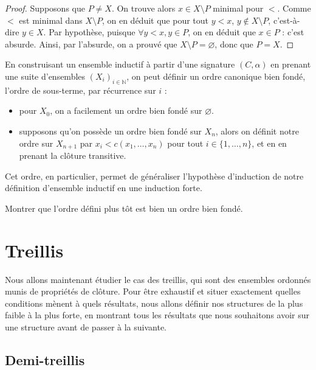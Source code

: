 \begin{proof}
  Supposons que $P\neq X$. On trouve alors $x\in X \setminus P$ minimal pour $<$.
  Comme $<$ est minimal dans
  $X\setminus P$, on en déduit que pour tout $y < x$, $y \notin X\setminus P$,
  c'est-à-dire $y\in X$. Par hypothèse, puisque $\forall y < x, y\in P$, on en
  déduit que $x\in P$ : c'est absurde. Ainsi, par l'absurde, on a prouvé que
  $X\setminus P = \varnothing$, donc que $P = X$.
\end{proof}

\begin{remark}
  En construisant un ensemble inductif à partir d'une signature $(C,\alpha)$ en
  prenant une suite d'ensembles $(X_i)_{i\in \mathbb N}$, on peut définir un ordre
  canonique bien fondé, l'ordre de sous-terme, par récurrence sur $i$ :
  \begin{itemize}
  \item pour $X_0$, on a facilement un ordre bien fondé sur $\varnothing$.
  \item supposons qu'on possède un ordre bien fondé sur $X_n$, alors on définit
    notre ordre sur $X_{n+1}$ par $x_i < c(x_1,\ldots,x_n)$ pour tout
    $i \in \{1,\ldots,n\}$, et en en prenant la clôture transitive.
  \end{itemize}

  Cet ordre, en particulier, permet de généraliser l'hypothèse d'induction de
  notre définition d'ensemble inductif en une induction forte.
\end{remark}

\begin{exercise}
  Montrer que l'ordre défini plus tôt est bien un ordre bien fondé.
\end{exercise}

\section{Treillis}

Nous allons maintenant étudier le cas des treillis, qui sont des ensembles
ordonnés munis de propriétés de clôture. Pour être exhaustif et situer exactement
quelles conditions mènent à quels résultats, nous allons définir nos structures
de la plus faible à la plus forte, en montrant tous les résultats que nous
souhaitons avoir sur une structure avant de passer à la suivante.

\subsection{Demi-treillis}

